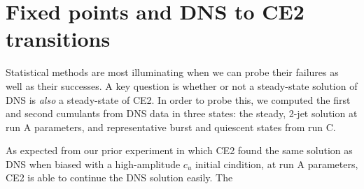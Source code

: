 \documentclass{jfm}
\newcommand{\cmark}{\ding{51}}%
\newcommand{\done}{\rlap{$\square$}{\raisebox{2pt}{\large\hspace{1pt}\cmark}}%
\hspace{-2.5pt}}
\begin{document}

\section{Fixed points and DNS to CE2 transitions}
\label{sec:fixed}
Statistical methods are most illuminating when we can probe their failures as well as their successes.
A key question is whether or not a steady-state solution of DNS is \emph{also} a steady-state of CE2.
In order to probe this, we computed the first and second cumulants from DNS data in three states: the steady, 2-jet solution at run A parameters, and representative burst and quiescent states from run C.

As expected from our prior experiment in which CE2 found the same solution as DNS when biased with a high-amplitude $c_u$ initial cindition, at run A parameters, CE2 is able to continue the DNS solution easily.
The 
\end{document}
